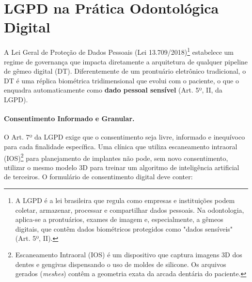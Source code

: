 
\section{LGPD na Prática Odontológica Digital}

A Lei Geral de Proteção de Dados Pessoais (Lei 13.709/2018)\footnote[1]{A LGPD é a lei brasileira que regula como empresas e instituições podem coletar, armazenar, processar e compartilhar dados pessoais. Na odontologia, aplica-se a prontuários, exames de imagem e, especialmente, a gêmeos digitais, que contêm dados biométricos protegidos como "dados sensíveis" (Art. 5º, II).} estabelece um regime de governança que impacta diretamente a arquitetura de qualquer pipeline de gêmeo digital (DT). Diferentemente de um prontuário eletrônico tradicional, o DT é uma réplica biométrica tridimensional que evolui com o paciente, o que o enquadra automaticamente como \textbf{dado pessoal sensível} (Art. 5º, II, da LGPD).

\paragraph{Consentimento Informado e Granular.}
O Art. 7º da LGPD exige que o consentimento seja livre, informado e inequívoco para cada finalidade específica. Uma clínica que utiliza escaneamento intraoral (IOS)\footnote[2]{Escaneamento Intraoral (IOS) é um dispositivo que captura imagens 3D dos dentes e gengivas dispensando o uso de moldes de silicone. Os arquivos gerados (\textit{meshes}) contêm a geometria exata da arcada dentária do paciente.} para planejamento de implantes não pode, sem novo consentimento, utilizar o mesmo modelo 3D para treinar um algoritmo de inteligência artificial de terceiros. O formulário de consentimento digital deve conter:

